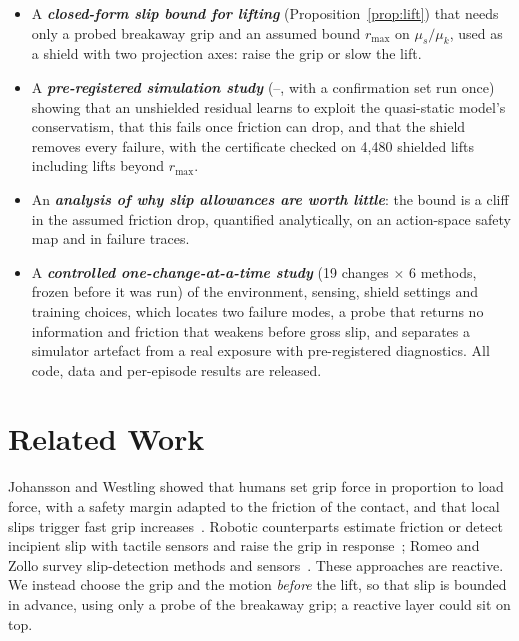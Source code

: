 \begin{itemize}
\item A \textbf{\emph{closed-form slip bound for lifting}} (Proposition~\ref{prop:lift}) that needs only a probed breakaway grip
and an assumed bound $r_{\max}$ on $\mu_s/\mu_k$, used as a shield with two projection axes: raise the grip or slow the lift.
\item A \textbf{\emph{pre-registered simulation study}} (--, with a confirmation set run once) showing that an unshielded
residual learns to exploit the quasi-static model's conservatism, that this fails once friction can drop, and that the
shield removes every failure, with the certificate checked on 4{,}480 shielded lifts including lifts beyond $r_{\max}$.
\item An \textbf{\emph{analysis of why slip allowances are worth little}}: the bound is a cliff in the assumed friction drop,
quantified analytically, on an action-space safety map and in failure traces.
\item A \textbf{\emph{controlled one-change-at-a-time study}} (19 changes $\times$ 6 methods, frozen before it was run) of the
environment, sensing, shield settings and training choices, which locates two failure modes, a probe that returns no
information and friction that weakens before gross slip, and separates a simulator artefact from a real exposure with
pre-registered diagnostics. All code, data and per-episode results are released.
\end{itemize}

\section{Related Work}
 Johansson and Westling showed that humans set grip force in proportion to load force,
with a safety margin adapted to the friction of the contact, and that local slips trigger fast grip increases~\cite{johansson1984}.
Robotic counterparts estimate friction or detect incipient slip with tactile sensors and raise the grip in
response~\cite{su2015,yuan2015,veiga2020}; Romeo and Zollo survey slip-detection methods and sensors~\cite{romeo2020}. These
approaches are reactive. We instead choose the grip and the motion \emph{before} the lift, so that slip is bounded in
advance, using only a probe of the breakaway grip; a reactive layer could sit on top.

